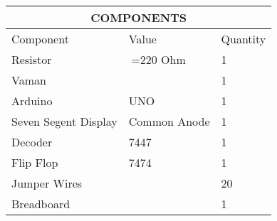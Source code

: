 \begin{tabular}{|p{5cm}|p{3cm}|p{2cm}|}
\hline
\multicolumn{3}{|c|}{COMPONENTS}\\
\hline
Component& Value& Quantity\\
\hline
Resistor& $\>$=220 Ohm& 1\\
\hline
Vaman& & 1\\
\hline
Arduino& UNO& 1\\
\hline
Seven Segent Display& Common Anode& 1\\
\hline
Decoder& 7447& 1\\
\hline
Flip Flop& 7474& 1\\
\hline
Jumper Wires&  & 20\\
\hline
Breadboard&  & 1\\
\hline
\end{tabular}
